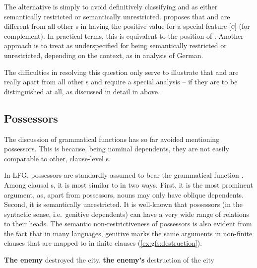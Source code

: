 \documentclass[output=paper]{../langscibook}
\begin{document}
 The alternative is simply to avoid definitively classifying \COMP and \XCOMP as either semantically restricted or semantically unrestricted. \citet{falk2001lexical} proposes that \COMP and \XCOMP are different from all other {\GF}s in having the positive value for a special feature [\textsc{c}] (for complement). In practical terms, this is equivalent to the position of \citet{zaeneng94}. Another approach is to treat \COMP as underspecified for being semantically restricted or unrestricted, depending on the context, as in  analysis of German.
 
 The difficulties in resolving this question only serve to illustrate that \COMP and \XCOMP are really apart from all other {\GF}s and require a special analysis -- if they are to be distinguished at all, as discussed in detail in  above.
 
 
 \subsection{Possessors\label{sect:gfs:poss}}
  \largerpage[-1]
 The discussion of grammatical functions has so far avoided mentioning possessors. This is because, being nominal dependents, they are not easily comparable to other, clause-level {\GF}s.
 
 In LFG, possessors are standardly assumed to bear the grammatical function \POSS. Among clausal {\GF}s, it is most similar to \SUBJ in two ways. First, it is the most prominent argument, as, apart from possessors, nouns may only have oblique dependents. Second, it is semantically unrestricted. It is well-known that possessors (in the syntactic sense, i.e.\ genitive dependents) can have a very wide range of relations to their heads. The semantic non-restrictiveness of possessors is also evident from the fact that in many languages, genitive marks the same arguments in non-finite clauses that are mapped to \SUBJ in finite clauses (\ref{ex:gfs:destruction}).
 
 \ea\label{ex:gfs:destruction}
    \ea \textbf{The enemy} destroyed the city.
    \ex\label{ex:gfs:destruction-poss} \textbf{the enemy's} destruction of the city
    \z
 \z
 
\end{document}
